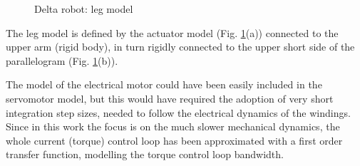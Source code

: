 \documentclass[]{interact}
\theoremstyle{plain}%
\theoremstyle{definition}
\theoremstyle{remark}
\begin{document}
\begin{figure}
{}
\caption{Delta robot: leg model} \label{Fig:Delta_robot_Modelica_leg_model}
\end{figure}
The leg model is defined by the actuator model (Fig. \ref{Fig:Delta_robot_Modelica_leg_model}(a)) connected to the upper arm (rigid body), in turn rigidly connected to the upper short side of the parallelogram (Fig. \ref{Fig:Delta_robot_Modelica_leg_model}(b)).

The model of the electrical motor could have been easily included \cite{FMRBM2002} in the servomotor model, but this would have required the adoption of very short integration step sizes, needed to follow the electrical dynamics of the windings. Since in this work the focus is on the much slower mechanical dynamics, the whole current (torque) control loop has been approximated with a first order transfer function, modelling the torque control loop bandwidth.
\end{document}
